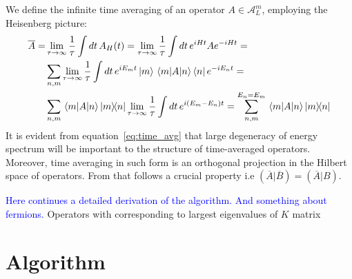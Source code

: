   We define the infinite time averaging of an operator \(A\in \mathcal{A}_L^m\), employing the Heisenberg picture:
  \begin{align}
  \overline{A} = &\lim_{\tau \rightarrow \infty} \frac{1}{\tau} \int dt\, A_{H}(t) =  \nonumber
  \lim_{\tau \rightarrow \infty} \frac{1}{\tau} \int dt\, e^{i H t}A e^{-i H t} = \\ \nonumber
  &\sum_{n,m} \lim_{\tau \rightarrow \infty} \frac{1}{\tau} \int dt\, e^{i E_m t}\ket{m}  
  \matrixel{m}{A}{n}\bra{n}  e^{-i E_n t} = \\ 
  & \sum_{n,m} \matrixel{m}{A}{n}\ketbra{m}{n} \lim_{\tau \rightarrow \infty} \frac{1}{\tau}
  \int dt \, e^{i(E_m-E_n)t} =  \sum_{n,m}^{E_n = E_m} \matrixel{m}{A}{n}\ketbra{m}{n}
  \label{eq:time_avg}
  \end{align}
  It is evident from equation~\eqref{eq:time_avg} that large degeneracy of energy spectrum will be important to the
  structure of time-averaged operators. Moreover, time averaging in such form is an orthogonal projection in the
  Hilbert space of operators. From that follows a crucial property i.e \(\left(\overline{A}|\overline{B}\right) = 
  \left(\overline{A}|B\right)\).
  
  \textcolor{blue}{Here continues a detailed derivation of the algorithm. And something about fermions.}
  Operators with corresponding to largest eigenvalues of \(K\) matrix 
  


  \section{Algorithm}
